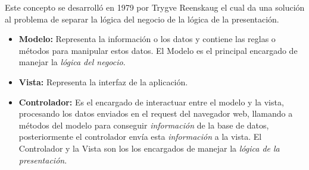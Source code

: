   Este concepto se desarrolló en 1979 por Trygve Reenskaug el cual da una
  solución al problema de separar la lógica del negocio de la lógica de la presentación.\\


  \begin{itemize}
    \item \textbf{Modelo:} Representa la información o los datos y contiene las reglas o métodos para manipular estos datos.
    El Modelo es el principal encargado de manejar  la \emph{lógica del negocio}.


    \item \textbf{Vista:}  Representa la interfaz de la aplicación.

    \item \textbf{Controlador:} Es el encargado de interactuar entre el modelo y la vista, procesando los datos enviados en el request del navegador web,
        llamando a métodos del modelo para conseguir  \emph{información} de la base de datos,
        posteriormente el controlador envía esta \emph{información} a la vista.
        El Controlador y la Vista son los los encargados de manejar  la \emph{lógica de la presentación}.
  \end{itemize}







